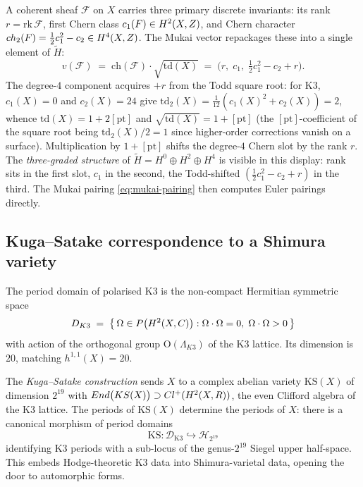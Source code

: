 A coherent sheaf $\mathcal F$ on $X$ carries three primary discrete invariants: its rank $r = \mathrm{rk}\, \mathcal F$, first Chern class $c_1(F) \in H^2(X, Z)$, and Chern character $ch_2(F) = \tfrac12 c_1^2 - c_2 \in H^4(X, Z)$. The Mukai vector repackages these into a single element of $\widetilde H$:
\[
  v(\mathcal F) \;=\; \mathrm{ch}(\mathcal F) \cdot \sqrt{\mathrm{td}(X)} \;=\; \bigl(r, \; c_1, \; \tfrac12 c_1^2 - c_2 + r\bigr).
\]
The degree-$4$ component acquires $+r$ from the Todd square root: for K3, $c_1(X) = 0$ and $c_2(X) = 24$ give $\mathrm{td}_2(X) = \tfrac{1}{12}(c_1(X)^2 + c_2(X)) = 2$, whence $\mathrm{td}(X) = 1 + 2[\mathrm{pt}]$ and $\sqrt{\mathrm{td}(X)} = 1 + [\mathrm{pt}]$ (the $[\mathrm{pt}]$-coefficient of the square root being $\mathrm{td}_2(X)/2 = 1$ since higher-order corrections vanish on a surface). Multiplication by $1 + [\mathrm{pt}]$ shifts the degree-$4$ Chern slot by the rank $r$. The \emph{three-graded structure} of $\widetilde H = H^0 \oplus H^2 \oplus H^4$ is visible in this display: rank sits in the first slot, $c_1$ in the second, the Todd-shifted $(\tfrac12 c_1^2 - c_2 + r)$ in the third. The Mukai pairing \eqref{eq:mukai-pairing} then computes Euler pairings directly.

\subsection{Kuga--Satake correspondence to a Shimura variety}

The period domain of polarised K3 is the non-compact Hermitian symmetric space
\[
  D_{K3} \;=\; \bigl\{\,\Omega \in P\bigl(H^2(X, C)\bigr) : \Omega \cdot \Omega = 0,\; \Omega \cdot \Omega > 0\,\bigr\}
\]
with action of the orthogonal group $\mathrm{O}(\Lambda_{K3})$ of the K3 lattice. Its dimension is $20$, matching $h^{1,1}(X) = 20$.

The \emph{Kuga--Satake construction} sends $X$ to a complex abelian variety $\mathrm{KS}(X)$ of dimension $2^{19}$ with $End\bigl(KS(X)\bigr) \supset Cl^+(H^2(X, R))$, the even Clifford algebra of the K3 lattice. The periods of $\mathrm{KS}(X)$ determine the periods of $X$: there is a canonical morphism of period domains
\[
  \mathrm{KS}\colon \mathcal D_{\mathrm{K3}} \hookrightarrow \mathcal H_{2^{19}}
\]
identifying K3 periods with a sub-locus of the genus-$2^{19}$ Siegel upper half-space. This embeds Hodge-theoretic K3 data into Shimura-varietal data, opening the door to automorphic forms.

